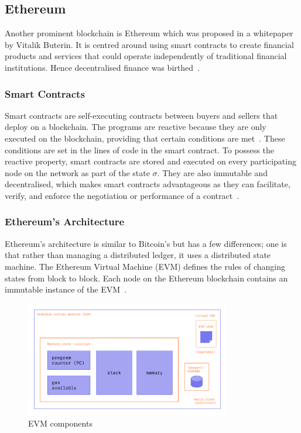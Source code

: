 \subsection{Ethereum}
Another prominent blockchain is Ethereum which was proposed in a whitepaper by Vitalik Buterin. It is centred around using smart contracts to create financial products and services that could operate independently of traditional financial institutions. Hence decentralised finance was birthed~\cite{buterin2014next}.

\subsubsection{Smart Contracts}
Smart contracts are self-executing contracts between buyers and sellers that deploy on a blockchain. The programs are reactive because they are only executed on the blockchain, providing that certain conditions are met~\cite{noauthor_what_nodate}. These conditions are set in the lines of code in the smart contract. To possess the reactive property, smart contracts are stored and executed on every participating node on the network as part of the state $\sigma$. They are also immutable and decentralised, which makes smart contracts advantageous as they can facilitate, verify, and enforce the negotiation or performance of a contract~\cite{noauthor_introduction_nodate, noauthor_smart_nodate}.

\subsubsection{Ethereum's Architecture}
Ethereum's architecture is similar to Bitcoin's but has a few differences; one is that rather than managing a distributed ledger, it uses a distributed state machine. The Ethereum Virtual Machine (EVM) defines the rules of changing states from block to block. Each node on the Ethereum blockchain contains an immutable instance of the EVM~\cite{noauthor_ethereum_nodate}.

\begin{figure}[!htb]
    \centering
    \includegraphics[width=0.8\textwidth]{background/Images/evm.png}
    \caption{EVM components~\cite{noauthor_ethereum_nodate}}
\end{figure}

